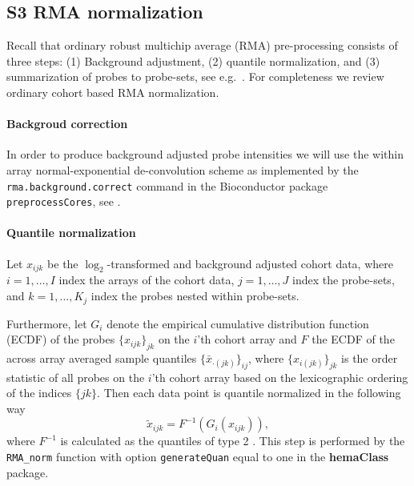 \documentclass[10pt,letterpaper]{article}
\newcommand{\pkg}[1]{\textbf{#1}}
\begin{document}
\subsection*{S3 RMA normalization}
Recall that ordinary robust multichip average (RMA) pre-processing consists of three steps: (1) Background adjustment, (2) quantile normalization, and (3) summarization of probes to probe-sets, see e.g.\ \cite{Irizarry2003, Irizarry2003b}. For completeness we review ordinary cohort based RMA normalization.

\paragraph{Backgroud correction}
In order to produce background adjusted probe intensities we will use the within array normal-exponential de-convolution scheme as implemented by the \texttt{rma.background.correct} command in the Bioconductor package \texttt{preprocessCores}, see
\cite{Irizarry2003b,Bolstad2004}.


\paragraph{Quantile normalization}
Let $x_{ijk}$ be the $\log_2$-transformed and background adjusted cohort data, where $i = 1,\dots,I$ index the arrays of the cohort data, $j=1,\dots,J$  index the probe-sets, and $k=1,\dots,K_j$ index the probes nested within probe-sets.

Furthermore, let $G_i$ denote the empirical cumulative distribution function (ECDF) of the probes $\{x_{ijk}\}_{jk}$ on the $i$'th cohort array and $F$ the ECDF of the across array averaged sample quantiles $\{\bar{x}_{\cdot (jk)}\}_{ij}$, where $\{x_{i(jk)}\}_{jk}$ is the order statistic of all probes on the $i$'th cohort array based on the lexicographic ordering of the indices $\{jk\}$. Then each data point is quantile normalized in the following way
\begin{equation*}
     \tilde{x}_{ijk} = F^{-1}(G_i(x_{ijk})),
\end{equation*}
where $F^{-1}$ is calculated as the quantiles of type 2 \cite{Hyndman1996}.
This step is performed by the \texttt{RMA\_norm} function with option \texttt{generateQuan} equal to one in the \pkg{hemaClass} package.
\end{document}
